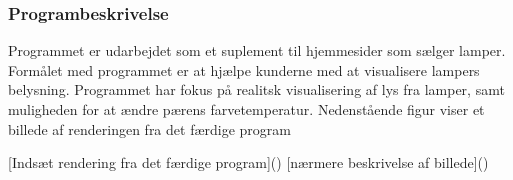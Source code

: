 \subsubsection{Programbeskrivelse}

Programmet er udarbejdet som et suplement til hjemmesider som sælger lamper. Formålet med programmet er at hjælpe kunderne med at visualisere lampers belysning. Programmet har fokus på realitsk visualisering af lys fra lamper, samt muligheden for at ændre pærens farvetemperatur.
Nedenstående figur viser et billede af renderingen fra det færdige program

[Indsæt rendering fra det færdige program]()
[nærmere beskrivelse af billede]()
